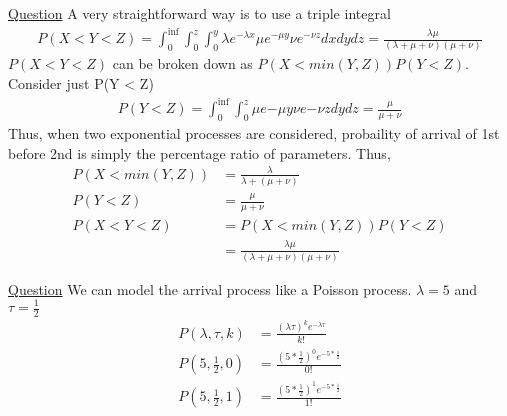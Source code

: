 \documentclass[../probability-notes.tex]{subfiles}
\begin{document}
\begin{enumerate}
        \hypertarget{a_threevar}{\item} \hyperlink{q_threevar}{Question}\newline
        A very straightforward way is to use a triple integral
        \begin{align*}
            P(X < Y < Z) = \int_{0}^{\inf} \int_{0}^{z} \int_{0}^{y} \lambda e^{-\lambda x} \mu e^{-\mu y} \nu e^{-\nu z} dx dy dz = \frac{\lambda \mu}{(\lambda + \mu + \nu)(\mu + \nu)}
        \end{align*}
        $P(X < Y < Z)$ can be broken down as $P(X < min(Y,Z)) P(Y < Z)$. Consider just P(Y < Z)
        \begin{align*}
            P(Y < Z) = \int_{0}^{\inf} \int_{0}^{z} \mu e{-\mu y} \nu e{-\nu z} dy dz = \frac{\mu}{\mu + \nu}
        \end{align*}
        Thus, when two exponential processes are considered, probaility of arrival of 1st before 2nd is simply the percentage ratio of parameters. Thus,
        \begin{align*}
            P(X < min(Y,Z)) &= \frac{\lambda}{\lambda + (\mu + \nu)} \tag*{$Y$ and $Z$ can be combined as a single process}\\
            P(Y < Z) &= \frac{\mu}{\mu + \nu}\\
            P(X < Y < Z) &= P(X < min(Y,Z)) P(Y < Z)\\
                        &= \frac{\lambda \mu}{(\lambda + \mu + \nu)(\mu + \nu)}
        \end{align*}


        \hypertarget{a_poissonemails}{\item} \hyperlink{q_poissonemails}{Question}
        We can model the arrival process like a Poisson process. $\lambda = 5$ and $\tau = \frac{1}{2}$
        \begin{align*}
                P(\lambda, \tau, k) &= \frac{(\lambda \tau)^{k} e^{-\lambda \tau}}{k!} \\
                P(5, \frac{1}{2}, 0) &= \frac{(5 * \frac{1}{2})^{0} e^{-5 * \frac{1}{2}}}{0!} \\
                P(5, \frac{1}{2}, 1) &= \frac{(5 * \frac{1}{2})^{1} e^{-5 * \frac{1}{2}}}{1!}
        \end{align*}


\end{enumerate}
\end{document}
